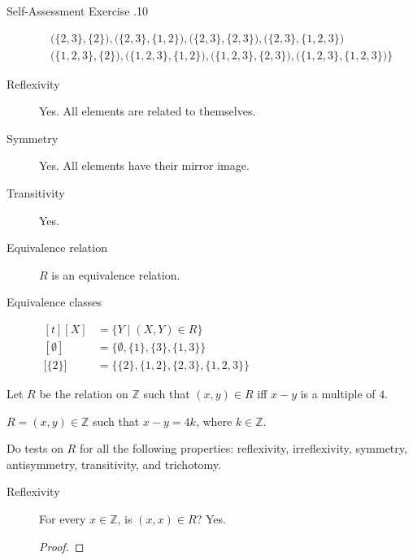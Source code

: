 \documentclass[\main/notes.tex]{subfiles}
\begin{document}
\begin{exercise}{Self-Assessment Exercise \thechapter.10}
\begin{questions}
\begin{questions}
\begin{answer}
\begin{description}
\begin{align*}
													& \quad \bigl(\{2, 3\}, \{2\}\bigr), \bigl(\{2, 3\}, \{1, 2\}\bigr), \bigl(\{2, 3\}, \{2, 3\}\bigr), \bigl(\{2, 3\}, \{1, 2, 3\}\bigr)\\
													& \quad \bigl(\{1, 2, 3\}, \{2\}\bigr), \bigl(\{1, 2, 3\}, \{1, 2\}\bigr), \bigl(\{1, 2, 3\}, \{2, 3\}\bigr), \bigl(\{1, 2, 3\}, \{1, 2, 3\}\bigr)\Bigr\}
												\end{align*}
										\end{description}
										\begin{description}
											\item[Reflexivity] Yes. All elements are related to themselves.
											\item[Symmetry] Yes. All elements have their mirror image.
											\item[Transitivity] Yes.
											\item[Equivalence relation] $R$ is an equivalence relation.
											\item[Equivalence classes] $
												\begin{aligned}[t]
													[X] &= \{Y \mid (X, Y) \in R\}\\
													[\emptyset] &= \bigl\{\emptyset, \{1\}, \{3\}, \{1, 3\}\bigr\}\\
													\bigl[\{2\}\bigr] &= \bigl\{\{2\}, \{1, 2\}, \{2, 3\}, \{1, 2, 3\}\bigr\}
												\end{aligned} $   
										\end{description}
								\end{answer}
							\end{questions}
						\item Let $R$ be the relation on $\mathbb{Z}$ such that $(x, y) \in R$ iff $x - y$ is a multiple of $4$.\\
							\begin{answer}
								$R = (x, y) \in \mathbb{Z}$ such that $ x - y = 4k$, where $k \in \mathbb{Z}$.
							\end{answer}
							\begin{questions}
								\item Do tests on $R$ for all the following properties: reflexivity, irreflexivity, symmetry, antisymmetry, transitivity, and trichotomy.
									\begin{answer}
										\begin{description}
											\item[Reflexivity] For every $x \in \mathbb{Z}$, is $(x, x) \in R$? Yes.
												\begin{proof}

\end{proof}
\end{description}
\end{answer}
\end{questions}
\end{questions}
\end{exercise}
\end{document}
